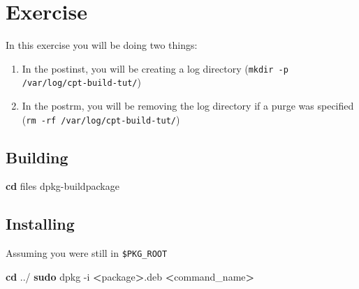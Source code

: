 \documentclass[]{article}
\newenvironment{Shaded}{}{}
\newcommand{\KeywordTok}[1]{\textcolor[rgb]{0.00,0.44,0.13}{\textbf{{#1}}}}
\newcommand{\NormalTok}[1]{{#1}}
\begin{document}
\section{Exercise}

In this exercise you will be doing two things:

\begin{enumerate}[1.]
\item
  In the postinst, you will be creating a log directory
  (\texttt{mkdir -p /var/log/cpt-build-tut/})
\item
  In the postrm, you will be removing the log directory if a purge was
  specified (\texttt{rm -rf /var/log/cpt-build-tut/})
\end{enumerate}
\subsection{Building}

\begin{Shaded}
\begin{Highlighting}[]
\KeywordTok{cd} \NormalTok{files}
\NormalTok{dpkg-buildpackage}
\end{Highlighting}
\end{Shaded}
\subsection{Installing}

Assuming you were still in \texttt{\$PKG\_ROOT}

\begin{Shaded}
\begin{Highlighting}[]
\KeywordTok{cd} \NormalTok{../}
\KeywordTok{sudo} \NormalTok{dpkg -i }\KeywordTok{<}\NormalTok{package}\KeywordTok{>}\NormalTok{.deb}
\KeywordTok{<}\NormalTok{command_name}\KeywordTok{>}
\end{Highlighting}
\end{Shaded}
\end{document}
